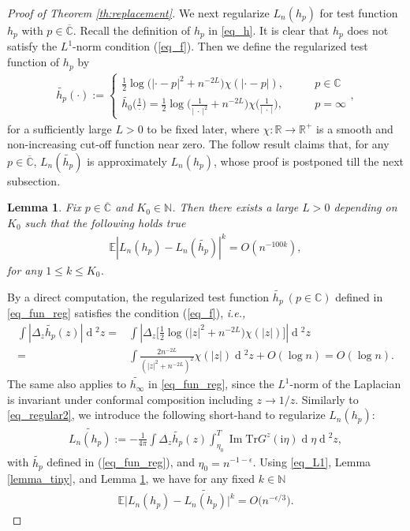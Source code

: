 \documentclass[10pt,reqno]{amsart}
\numberwithin{equation}{section}
\numberwithin{figure}{section}
\theoremstyle{plain}
\newtheorem{lemma}[theorem]{Lemma}
\newcommand{\R}{{\mathbb{R}}}
\newcommand{\N}{{\mathbb{N}}}
\newcommand{\C}{{\mathbb{C}}}
\newcommand{\ii}{\mathrm{i}}
\newcommand{\wt}{\widetilde}
\newcommand{\<}{\langle}
\renewcommand{\>}{\rangle}
\newcommand{\E}{\mathbb{E}}
\newcommand{\dd}{\operatorname{d}\!{}}
\newcommand{\ie}{\emph{i.e., }}
\renewcommand{\Im}{\operatorname{Im}}
\begin{document}
\begin{proof}[Proof of Theorem \ref{th:replacement}]
We next regularize $L_n(h_p)$ for test function $h_{p}$ with $p\in \overline{\C}$. Recall the definition of $h_p$ in \eqref{eq_h}.  
%
It is clear that $h_p$ does not satisfy the $L^{1}$-norm condition (\ref{eq_f}). 
%
%
%
Then we define the regularized test function of $h_p$ by 
\begin{align}\label{eq_fun_reg}
\wt{h_p} (\cdot):=
\begin{cases}
\frac{1}{2}\log \big(|\cdot-p|^2+n^{-2L}\big) \chi(|\cdot-p|), \qquad & p\in \C\\
\wt{h_0}\Big(\frac{1}{\cdot}\Big)=\frac{1}{2}\log \Big(\frac{1}{|~\cdot~|^2}+n^{-2L}\Big) \chi\Big(\frac{1}{|~\cdot~|}\Big), \qquad &p=\infty
\end{cases},
\end{align}
for a sufficiently large $L>0$ to be fixed later, where $\chi:\R \rightarrow \R^+$ is a smooth and non-increasing cut-off function near zero. 
%
%
%
%
%
The follow result claims that, for any $p\in \overline{\C}$, $L_n(\wt{h_p})$ is approximately $L_n(h_p)$, whose proof is postponed till the next subsection.  
\begin{lemma}\label{lemma_LL}
Fix $p\in \overline{\C}$ and $K_0 \in \N$. Then there exists a large $L>0$ depending on $K_0$ such that the following holds true 
\begin{align}
\E \left| L_n(h_p)-L_n(\wt{h_p})\right|^k=O(n^{-100k}),
\end{align}
for any  $1\leq k\leq K_0$. 
\end{lemma}






By a direct computation, the regularized test function $\wt{h_p}~(p \in \C)$ defined in \eqref{eq_fun_reg} satisfies the condition (\ref{eq_f}), \ie 
\begin{align}
	\int|\Delta_z \wt{h_p}(z)| \dd^2 z
	=&\int \left| \Delta_z \Big[\frac{1}{2}\log \big(|z|^2+n^{-2L}\big) \chi(|z|)\Big] \right| \dd^2 z\\
	=& \int \frac{2 n^{-2L}}{(|z|^2+n^{-2L})^2} \chi(|z|)\dd^2 z +O(\log n)=O(\log n).\label{eq_L1}
\end{align}
The same also applies to $\wt{h_\infty}$ in \eqref{eq_fun_reg}, since the 
$L^{1}$-norm of the Laplacian is invariant under conformal composition including $z \rightarrow 1/z$. Similarly to \eqref{eq_regular2}, we introduce the following short-hand to regularize $L_n(h_{p})$:
\begin{align}\label{eq_regular3}
\wt{L_n(h_{p})}:=-\frac{1}{4\pi} \int \Delta_z \wt{h_{p}}(z) \int_{\eta_0}^{T} \Im \mathrm{Tr} G^{z}(\ii \eta) \dd \eta \dd^2 z,
\end{align}
with $\wt{h_{p}}$ defined in (\ref{eq_fun_reg}), and $\eta_0=n^{-1-\epsilon}$. Using \eqref{eq_L1}, Lemma \ref{lemma_tiny}, and Lemma \ref{lemma_LL}, we have for any fixed $k\in \N$
\begin{align}\label{eq_regular4}
\E \Big| L_n(h_p)-\wt{L_n(h_{p})}\Big|^k=O\big( n^{-\epsilon/3}\big).
\end{align}








\end{proof}
\end{document}
